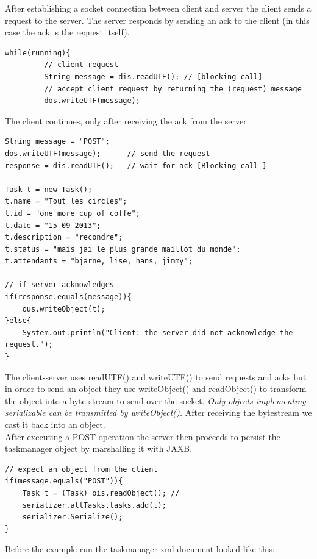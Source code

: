 After establishing a socket connection between client and server the client sends a request to the server. The server responds by sending an ack to the client (in this case the ack is the request itself).
% 

\begin{lstlisting}[caption= server sends an ack to a request]
while(running){
         // client request
         String message = dis.readUTF(); // [blocking call]
         // accept client request by returning the (request) message
         dos.writeUTF(message);    

\end{lstlisting}

The client continues, only after receiving the ack from the server.
\begin{lstlisting}[caption=client request and wait for ack]
String message = "POST";
dos.writeUTF(message);		// send the request
response = dis.readUTF();	// wait for ack [Blocking call ]

Task t = new Task();
t.name = "Tout les circles";
t.id = "one more cup of coffe";
t.date = "15-09-2013";	
t.description = "recondre";
t.status = "mais jai le plus grande maillot du monde";
t.attendants = "bjarne, lise, hans, jimmy";

// if server acknowledges
if(response.equals(message)){
   	ous.writeObject(t);
}else{
   	System.out.println("Client: the server did not acknowledge the request.");
}
\end{lstlisting}


The client-server uses readUTF() and writeUTF() to send requests and acks but in order to send an object they use writeObject() and readObject() to transform the object into a byte stream to send over the socket. \textit{Only objects implementing serializable can be transmitted by writeObject().} After receiving the bytestream we cast it back into an object.\\

After executing a POST operation the server then proceeds to persist the taskmanager object by marshalling it with JAXB.

\begin{lstlisting}[caption=server POST]
// expect an object from the client
if(message.equals("POST")){   
	Task t = (Task) ois.readObject(); // 
	serializer.allTasks.tasks.add(t);
    serializer.Serialize();	
}
\end{lstlisting}

Before the example run the taskmanager xml document looked like this:

